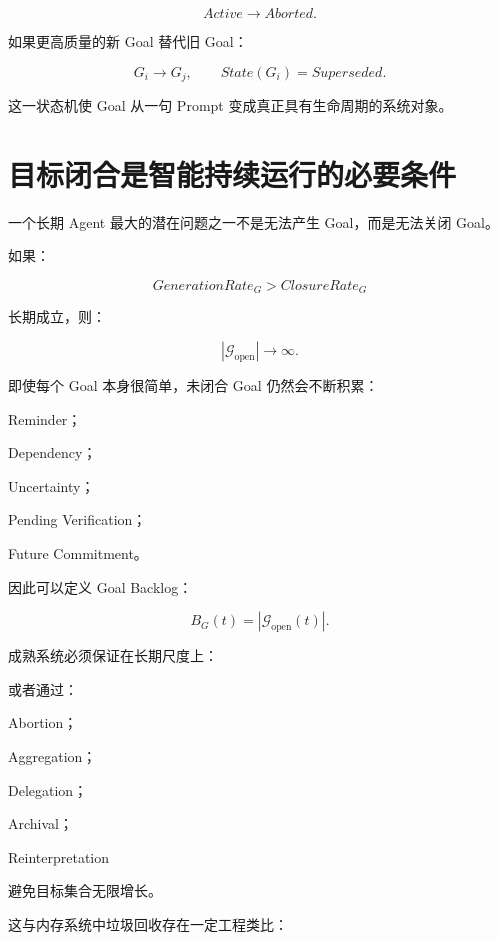 \[
Active
\rightarrow
Aborted.
\]

如果更高质量的新 Goal 替代旧 Goal：

\[
G_i
\rightarrow
G_j,
\qquad
State(G_i)=Superseded.
\]

这一状态机使 Goal 从一句 Prompt 变成真正具有生命周期的系统对象。


\section{目标闭合是智能持续运行的必要条件}

一个长期 Agent 最大的潜在问题之一不是无法产生 Goal，而是无法关闭 Goal。

如果：

\[
GenerationRate_G
>
ClosureRate_G
\]

长期成立，则：

\[
|\mathcal G_{\mathrm{open}}|
\rightarrow
\infty.
\]

即使每个 Goal 本身很简单，未闭合 Goal 仍然会不断积累：

Reminder；

Dependency；

Uncertainty；

Pending Verification；

Future Commitment。

因此可以定义 Goal Backlog：

\[
B_G(t)
=
|\mathcal G_{\mathrm{open}}(t)|.
\]

成熟系统必须保证在长期尺度上：

\begin{statementbox}
\centering
{}
\end{statementbox}

或者通过：

Abortion；

Aggregation；

Delegation；

Archival；

Reinterpretation

避免目标集合无限增长。

这与内存系统中垃圾回收存在一定工程类比：

\begin{statementbox}
\centering
{}
\end{statementbox}

